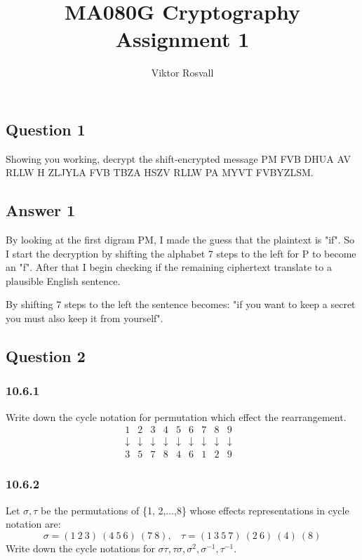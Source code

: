 \documentclass{article}
\title{MA080G Cryptography Assignment 1}
\author{Viktor Rosvall}
\begin{document}
	\maketitle
	\subsection*{Question 1}
	Showing you working, decrypt the shift-encrypted message
	PM FVB DHUA AV RLLW H ZLJYLA FVB TBZA HSZV RLLW PA MYVT
	FVBYZLSM.
	
	\subsection*{Answer 1}
	By looking at the first digram PM, I made the guess that the plaintext is "if". So I start the decryption by shifting the alphabet 7 steps to the left for P to become an "f". After that I begin checking if the remaining ciphertext translate to a  plausible English sentence. 
	
	By shifting 7 steps to the left the sentence becomes: "if you want to keep a secret you must also keep it from yourself".
	
	\subsection*{Question 2}
	\subsubsection*{10.6.1}
	Write down the cycle notation for permutation which effect the rearrangement.
	\[
	\begin{matrix}
		1 & 2 & 3 & 4 & 5 & 6 & 7 & 8 & 9 \\
		\downarrow & \downarrow & \downarrow & \downarrow & \downarrow & \downarrow & \downarrow & \downarrow & \downarrow & \\
		3 & 5 & 7 & 8 & 4 & 6 & 1 & 2 & 9
	\end{matrix}
	\]
	
	\subsubsection*{10.6.2}
	Let $\sigma, \tau$ be the permutations of \{1, 2,...,8\} whose effects representations in cycle notation are: 
	$$\sigma = (1 \ 2 \ 3) \ (4 \ 5 \ 6) \ (7 \ 8), \ \ \ \ \tau = (1 \ 3 \ 5 \ 7) \ (2 \ 6) \ (4) \ (8)$$
	Write down the cycle notations for $\sigma\tau,\tau\sigma,\sigma^2,\sigma^{-1},\tau^{-1}$.
	
\end{document}
